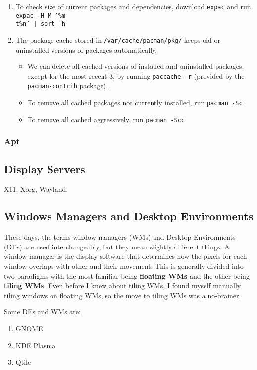 \documentclass{article}
\begin{document}
\begin{enumerate}
        \item To check size of current packages and dependencies, download \texttt{expac} and run \texttt{expac -H M '\%m \\t\%n' | sort -h} 

        \item The package cache stored in \texttt{/var/cache/pacman/pkg/} keeps old or uninstalled versions of packages automatically. 
        \begin{itemize}
          \item We can delete all cached versions of installed and uninstalled packages, except for the most recent 3, by running \texttt{paccache -r} (provided by the \texttt{pacman-contrib} package). 
          \item To remove all cached packages not currently installed, run \texttt{pacman -Sc}
          \item To remove all cached aggressively, run \texttt{pacman -Scc}
        \end{itemize} 
      \end{enumerate}

    \subsubsection{Apt}  
  
  \subsection{Display Servers}

    X11, Xorg, Wayland.

  \subsection{Windows Managers and Desktop Environments}

  These days, the terms window managers (WMs) and Desktop Environments (DEs) are used interchangeably, but they mean slightly different things. A window manager is the display software that determines how the pixels for each window overlaps with other and their movement. This is generally divided into two paradigms with the most familiar being \textbf{floating WMs} and the other being \textbf{tiling WMs}. Even before I knew about tiling WMs, I found myself manually tiling windows on floating WMs, so the move to tiling WMs was a no-brainer. 
  
  Some DEs and WMs are: 
  \begin{enumerate}
    \item GNOME 
    \item KDE Plasma
    \item Qtile
  \end{enumerate}
\end{document}
